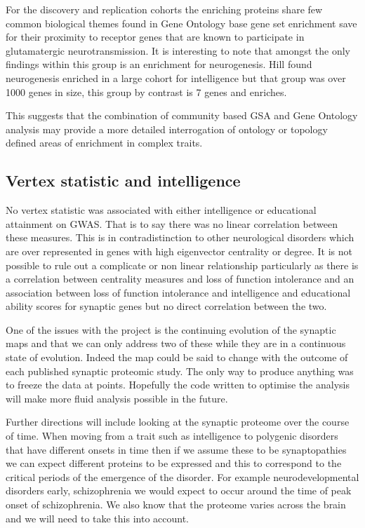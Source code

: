 For the discovery and replication cohorts the enriching proteins share few common biological themes found in Gene Ontology base gene set enrichment save for their proximity to receptor genes that are known to participate in glutamatergic neurotransmission. It is interesting to note that amongst the only findings within this group is an enrichment for neurogenesis. Hill found neurogenesis enriched in a large cohort for intelligence but that group was over 1000 genes in size, this group by contrast is 7 genes and enriches. 



This suggests that the combination of community based GSA and Gene Ontology analysis may provide a more detailed interrogation of ontology or topology defined areas of enrichment in complex traits. 


\subsection{Vertex statistic and intelligence}

No vertex statistic was associated with either intelligence or educational attainment on GWAS. That is to say there was no linear correlation between these measures. This is in contradistinction to other neurological disorders which are over represented in genes with high eigenvector centrality or degree. It is not possible to rule out a complicate or non linear relationship particularly as there is a correlation between centrality measures and loss of function intolerance and an association between loss of function intolerance and intelligence and educational ability scores for synaptic genes but no direct correlation between the two. 




One of the issues with the project is the continuing evolution of the synaptic maps and that we can only address two of these while they are in a continuous state of evolution. Indeed the map could be said to change with the outcome of each published synaptic proteomic study. The only way to produce anything was to freeze the data at points. Hopefully the code written to optimise the analysis will make more fluid analysis possible in the future.

Further directions will include looking at the synaptic proteome over the course of time. When moving from a trait such as intelligence to polygenic disorders that have different onsets in time then if we assume these to be synaptopathies we can expect different proteins to be expressed and this to correspond to the critical periods of the emergence of the disorder. For example neurodevelopmental disorders early, schizophrenia we would expect to occur around the time of peak onset of schizophrenia. We also know that the proteome varies across the brain and we will need to take this into account.

